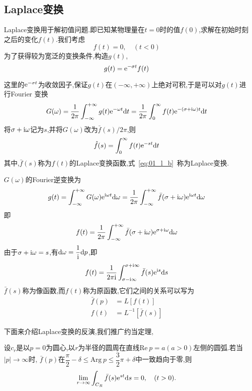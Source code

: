 \subsection{Laplace变换}
Laplace变换用于解初值问题.即已知某物理量在$t=0$时的值$f(0)$,求解在初始时刻之后的变化$f(t)$.我们考虑
\begin{equation}
 f(t)=0,\quad (t<0)
\end{equation}
为了获得较为宽泛的变换条件,构造$g(t)$,
\begin{equation}
 g(t)=\mathrm{e}^{-\sigma t}f(t)
\end{equation}\par
这里的$\mathrm{e}^{-\sigma t}$为收敛因子,保证$g(t)$在$(-\infty,+\infty)$上绝对可积,于是可以对$g(t)$进行Fourier
变换
\begin{equation*}
G(\omega)=\dfrac{1}{2\pi}\int_{-\infty}^{+\infty} g(t)\mathrm{e}^{-\omega t}\mathrm{d} t=
\dfrac{1}{2\pi}\int_{0}^{\infty}f(t)\mathrm{e}^{-(\sigma+\mathrm{i}\omega)t}\mathrm{d} t
\end{equation*}
将$\sigma+\mathrm{i}\omega$记为$s$,并将$G(\omega)$改为$\bar{f}(s)/2\pi$,则
\begin{equation}\label{eq:01_l_b}
 \hat{f}(s)=\int_{0}^{\infty}f(t)\mathrm{e}^{-st}\mathrm{d} t
\end{equation}
其中,$\bar{f}(s)$称为$f(t)$的Laplace变换函数,式~\eqref{eq:01_l_b}~称为Laplace变换.\par
$G(\omega)$的Fourier逆变换为
\begin{equation*}
 g(t)=\int_{-\infty}^{+\infty}G(\omega)\mathrm{e}^{\mathrm{i}\omega t}\mathrm{d}\omega
     =\dfrac{1}{2\pi}\int_{-\infty}^{+\infty}\bar{f}(\sigma+\mathrm{i}\omega)\mathrm{e}^{\mathrm{i}\omega t}\mathrm{d}\omega
\end{equation*}
即
\begin{equation}
f(t)=\dfrac{1}{2\pi}\int_{-\infty}^{+\infty}\bar{f}(\sigma+\mathrm{i}\omega)\mathrm{e}^{\sigma+\mathrm{i}\omega}\mathrm{d}\omega
\end{equation}
由于$\sigma+\mathrm{i}\omega=s$,有$\mathrm{d}\omega=\dfrac{1}{\mathrm{i}}\mathrm{d} p$,即
\begin{equation}
 f(t)=\dfrac{1}{2\pi\mathrm{i}}\int_{\sigma-\mathrm{i}\infty}^{\sigma+\mathrm{i}\infty}\bar{f}(s)\mathrm{e}^{\mathrm{i} s}\mathrm{d} s
\end{equation}
$\bar{f}(s)$称为像函数,而$f(t)$称为原函数,它们之间的关系可以写为
\begin{align}
 \bar{f}(p)&=L[f(t)]  \\
 f(t)&=L^{-1}[\bar{f}(s)]
\end{align}\par
下面来介绍Laplace变换的反演,我们推广约当定理,
\begin{Theorem}[推广的约当定理]
 设$c_r$是以$p=0$为圆心,以$r$为半径的圆周在直线$\mathrm{Re}\ p=a(a>0)$左侧的圆弧.若当$|p|\to\infty$时,
 $\bar{f}(p)$在$\dfrac{\pi}{2}-\delta\leq \mathrm{Arg}\ p\leq\dfrac{3}{2}\pi+\delta$中一致趋向于零,则
 \begin{equation}\label{eq:01_l_yd}
  \lim_{r\to\infty}\int_{C_R}\bar{f}(s)\mathrm{e}^{st}\mathrm{d} s=0,\quad (t>0).
 \end{equation}
\end{Theorem}\par
